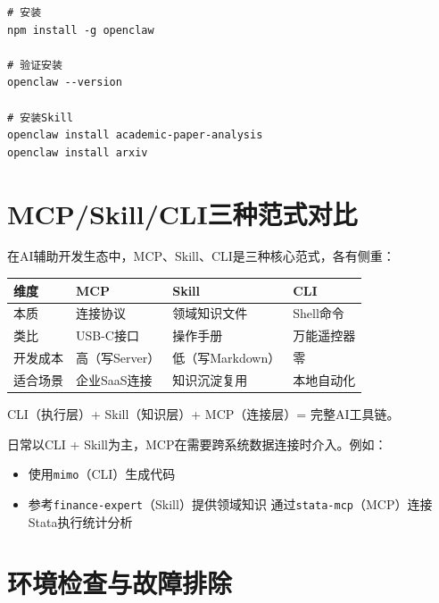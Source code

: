 \begin{lstlisting}[style=shell]
# 安装
npm install -g openclaw

# 验证安装
openclaw --version

# 安装Skill
openclaw install academic-paper-analysis
openclaw install arxiv
\end{lstlisting}

\section{MCP/Skill/CLI三种范式对比}

在AI辅助开发生态中，MCP、Skill、CLI是三种核心范式，各有侧重：

\begin{table}[H]
\centering
\begin{tabular}{llll}
\toprule
\textbf{维度} & \textbf{MCP} & \textbf{Skill} & \textbf{CLI} \\
\midrule
本质 & 连接协议 & 领域知识文件 & Shell命令 \\
类比 & USB-C接口 & 操作手册 & 万能遥控器 \\
开发成本 & 高（写Server） & 低（写Markdown） & 零 \\
适合场景 & 企业SaaS连接 & 知识沉淀复用 & 本地自动化 \\
\bottomrule
\end{tabular}
\end{table}

\begin{notebox}[黄金组合]
CLI（执行层）+ Skill（知识层）+ MCP（连接层）= 完整AI工具链。

日常以CLI + Skill为主，MCP在需要跨系统数据连接时介入。例如：
\begin{itemize}
  \item 使用\texttt{mimo}（CLI）生成代码
  \item 参考\texttt{finance-expert}（Skill）提供领域知识
  通过\texttt{stata-mcp}（MCP）连接Stata执行统计分析
\end{itemize}
\end{notebox}

\section{环境检查与故障排除}

